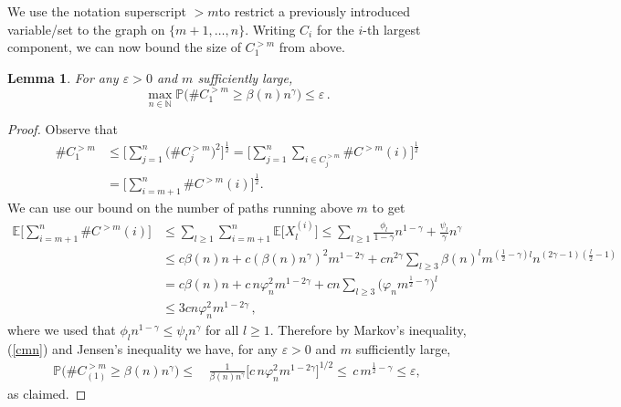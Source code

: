 \documentclass[12pt,a4paper]{article}
\numberwithin{equation}{section}
\newtheorem{lemma}[shared]{Lemma}
\begin{document}
We use the notation superscript \glqq $>m$\grqq \;to restrict a previously introduced variable/set to the graph on $\{m+1,\dots,n\}$. Writing $C_{i}$ for the $i$-th largest component, we can now bound the size of $C_{1}^{>m}$ from above.

\begin{lemma}\label{lcc}
For any $\varepsilon>0$ and $m$ sufficiently large,
$$ \max_{n\in\mathbb N}
    \mathbb{P}\big(\#C_{1}^{>m}\ge \beta(n)n^\gamma \big) \le \varepsilon \,.$$
\end{lemma}

\begin{proof}
 Observe that
\begin{equation}
    \begin{aligned}\label{cmn}
    \#C_{1}^{>m}  & \le \Big[\sum_{j=1}^n \big( \#C^{>m}_{j}\big)^2 \Big]^{\frac12} =
   \Big[\sum_{j=1}^n\sum_{i\in C_{j}^{>m}} \#C^{>m}(i) \Big]^{\frac12}\\ &   = \Big[\sum_{i={m}+1}^n \#C^{>m}(i) \Big]^{\frac12}.
\end{aligned}
\end{equation}
We can use our bound on the number of paths running above $m$ to get
\begin{align*}
   \mathbb E   \bigg[\sum_{i={m+1}}^n \#C^{>m}(i) \bigg] & \le  \sum_{l\ge1}  \sum_{i=m+1}^{n} \mathbb E\big[X^{(i)}_l\big] 
   \le   \sum_{l\ge1} \frac{\phi_l}{1-\gamma} n^{1-\gamma} + \frac{\psi_l}{\gamma} n^{\gamma} 
    \\ & \le c\beta(n)n+c(\beta(n)n^\gamma)^2m^{1-2\gamma}+cn^{2\gamma}\sum_{l\ge3} \beta(n)^l m^{(\tfrac12-\gamma)l} n^{(2\gamma-1)(\tfrac{l}{2}-1)}
    \\ & = c\beta(n)n+c\,n \varphi_n^2m^{1-2\gamma}+cn \sum_{l\ge3} \big(\varphi_n m^{\tfrac12-\gamma}\big)^l 
    \\ & \le 3 cn\varphi_n^2m^{1-2\gamma}\,,
\end{align*}
where we used that $\phi_ln^{1-\gamma} \le \psi_l n^{\gamma} $ for all $l\ge1$. Therefore by Markov's inequality, (\ref{cmn}) and Jensen's inequality we have, for any $\varepsilon>0$ and $m$ sufficiently large,
\begin{equation}
\begin{aligned}
    \mathbb{P}\big(\#C_{(1)}^{>m}\ge \beta(n)n^\gamma \big) \le &\,\frac{1}{\beta(n)n^\gamma }\Big[c\,n\varphi_n^2m^{1-2\gamma}  \Big]^{1/2}  
     \le \,c\,m^{\tfrac12-\gamma}  \le \varepsilon,
\end{aligned}
\end{equation}
as claimed.
\end{proof}
\end{document}

